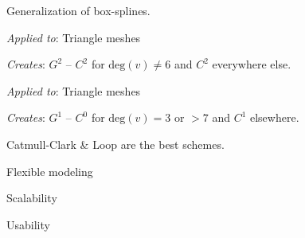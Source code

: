 \begin{algorithm}[Loop]
  Generalization of box-splines.

  \textit{Applied to}: Triangle meshes

  \textit{Creates}: \(G^2\) -- \(C^2\) for \(\text{deg}(v) \neq 6\) and \(C^2\) everywhere else.
\end{algorithm}

\begin{algorithm}
  \textit{Applied to}: Triangle meshes

  \textit{Creates}: \(G^1\) -- \(C^0\) for \(\text{deg}(v) = 3\) or \(> 7\) and \(C^1\) elsewhere.
\end{algorithm}

\begin{theorem}
  Catmull-Clark \& Loop are the best schemes.
\end{theorem}

\begin{itemize*}
  \item Flexible modeling
  \item Scalability
  \item Usability
\end{itemize*}

